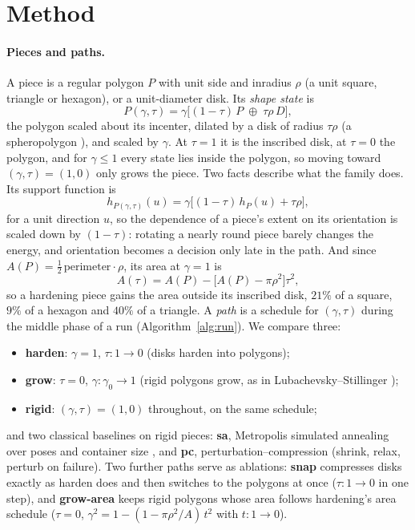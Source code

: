 \section{Method}\label{sec:method}
\paragraph{Pieces and paths.} A piece is a regular polygon $P$ with unit side and inradius $\rho$ (a unit square, triangle or hexagon), or a unit-diameter disk. Its \emph{shape state} is
\[
P(\gamma,\tau)=\gamma\big[(1-\tau)\,P\;\oplus\;\tau\rho\,D\big],
\]
the polygon scaled about its incenter, dilated by a disk of radius $\tau\rho$ (a spheropolygon \cite{AlonsoMarroquin2008}), and scaled by $\gamma$. At $\tau=1$ it is the inscribed disk, at $\tau=0$ the polygon, and for $\gamma\le1$ every state lies inside the polygon, so moving toward $(\gamma,\tau)=(1,0)$ only grows the piece. Two facts describe what the family does. Its support function is
\[
h_{P(\gamma,\tau)}(u)=\gamma\big[(1-\tau)\,h_P(u)+\tau\rho\big],
\]
for a unit direction $u$, so the dependence of a piece's extent on its orientation is scaled down by $(1-\tau)$: rotating a nearly round piece barely changes the energy, and orientation becomes a decision only late in the path. And since $A(P)=\tfrac12\,\mathrm{perimeter}\cdot\rho$, its area at $\gamma=1$ is
\[
A(\tau)=A(P)-\big[A(P)-\pi\rho^2\big]\tau^2 ,
\]
so a hardening piece gains the area outside its inscribed disk, $21\%$ of a square, $9\%$ of a hexagon and $40\%$ of a triangle. A \emph{path} is a schedule for $(\gamma,\tau)$ during the middle phase of a run (Algorithm~\ref{alg:run}). We compare three:
\begin{itemize}\itemsep0pt
\item \textbf{harden}: $\gamma=1$, $\tau:1\to0$ (disks harden into polygons);
\item \textbf{grow}: $\tau=0$, $\gamma:\gamma_0\to1$ (rigid polygons grow, as in Lubachevsky--Stillinger \cite{lubachevsky});
\item \textbf{rigid}: $(\gamma,\tau)=(1,0)$ throughout, on the same schedule;
\end{itemize}
and two classical baselines on rigid pieces: \textbf{sa}, Metropolis simulated annealing over poses and container size \cite{kirkpatrick}, and \textbf{pc}, perturbation--compression \cite{Gensane2004,gensane} (shrink, relax, perturb on failure). Two further paths serve as ablations: \textbf{snap} compresses disks exactly as harden does and then switches to the polygons at once ($\tau:1\to0$ in one step), and \textbf{grow-area} keeps rigid polygons whose area follows hardening's area schedule ($\tau=0$, $\gamma^2=1-(1-\pi\rho^2/A)\,t^2$ with $t:1\to0$).

